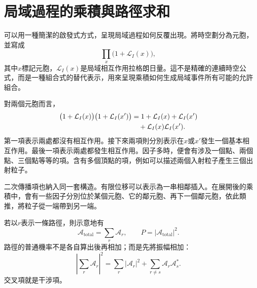 \section{局域過程的乘積與路徑求和}

可以用一種簡潔的啟發式方式，呈現局域過程如何反覆出現。將時空劃分為元胞，並寫成
\begin{equation}
\prod_x\bigl(1+\mathcal L_I(x)\bigr),
\end{equation}
其中\(x\)標記元胞，\(\mathcal L_I(x)\)是局域相互作用拉格朗日量。這不是精確的連續時空公式，而是一種組合式的替代表示，用來呈現乘積如何生成局域事件所有可能的允許組合。

\begin{classroomqa}
\end{classroomqa}

對兩個元胞而言，
\begin{align}
\bigl(1+\mathcal L_I(x)\bigr)
\bigl(1+\mathcal L_I(x')\bigr)
&=
1+\mathcal L_I(x)+\mathcal L_I(x')
\notag\\
&\quad{}+\mathcal L_I(x)\mathcal L_I(x').
\end{align}
第一項表示兩處都沒有相互作用。接下來兩項則分別表示在\(x\)或\(x'\)發生一個基本相互作用。最後一項表示兩處都發生相互作用。因子多時，便會有涉及一個點、兩個點、三個點等等的項。含有多個頂點的項，例如可以描述兩個入射粒子產生三個出射粒子。

二次傳播項也納入同一套構造。有限位移可以表示為一串相鄰插入。在展開後的乘積中，會有一些因子分別位於某個元胞、它的鄰元胞、再下一個鄰元胞，依此類推，將粒子從一端帶到另一端。

\begin{classroomqa}
\end{classroomqa}

若以\(r\)表示一條路徑，則示意地有
\begin{equation}
\mathcal A_{\mathrm{total}}=\sum_r\mathcal A_r,
\qquad
P=\left|\mathcal A_{\mathrm{total}}\right|^2.
\end{equation}
路徑的普通機率不是各自算出後再相加；而是先將振幅相加：
\begin{equation}
\left|\sum_r\mathcal A_r\right|^2
=
\sum_r|\mathcal A_r|^2
+
\sum_{r\ne s}\mathcal A_r\mathcal A_s^*.
\end{equation}
交叉項就是干涉項。

